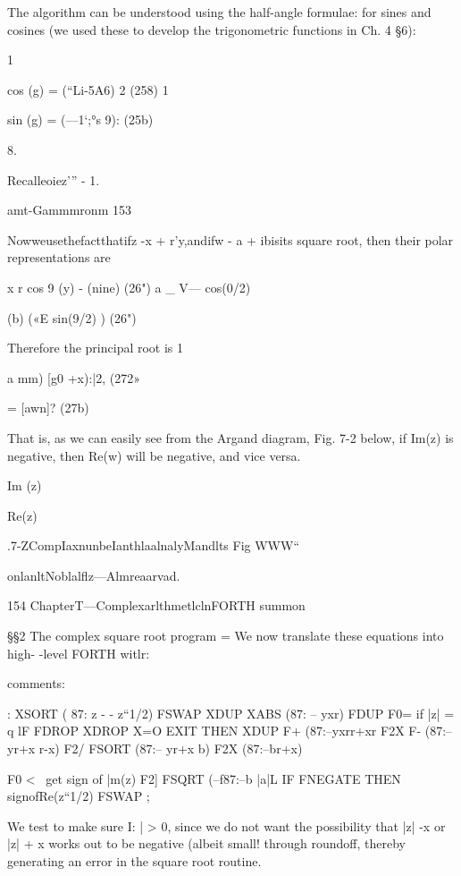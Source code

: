 {The algorithm can be understood using the half-angle formulae:
for sines and cosines (we used these to develop the trigonometric
functions in Ch. 4 §6):

1

cos (g) = (“Li-5A6) 2 (258)
1

sin (g) = (—1‘;°s 9): (25b)

 

8.

Recalleoiez'” - 1.

amt-Gammmronm 153

Nowweusethefactthatifz -x + r'y,andifw - a + ibisits
square root, then their polar representations are

x r cos 9
(y) - (nine) (26")
a _ V— cos(0/2)

(b) («E sin(9/2) ) (26")

Therefore the principal root is
1

a mm) [g0 +x):|2, (272»

= [awn]? (27b)

That is, as we can easily see from the Argand diagram, Fig. 7-2
below, if Im(z) is negative, then Re(w) will be negative, and vice
versa.

 

 

Im (z)

Re(z)

 

 

 

 

.7-ZCompIaxnunbeIanthlaalnalyMandlts
Fig WWW“

onlanltNoblalﬂz—Almreaarvad.

154 ChapterT—ComplexarlthmetlclnFORTH summon}

§§2 The complex square root program =
We now translate these equations into high- -level FORTH witlr:

comments:

: XSORT ( 87: z - - z“1/2)
FSWAP XDUP XABS (87: -- yxr)
FDUP F0= \retumO if |z| = q
lF FDROP XDROP X=O EXIT THEN
XDUP F+ (87:--yxrr+xr
F2X F- (87:-- yr+x r-x)
F2/ FSORT (87:-- yr+x b)
F2X (87:--br+x)

F0 < \ get sign of |m(z)
F2] FSQRT (--f87:--b |a|L
IF FNEGATE THEN  signofRe(z“1/2)
FSWAP ;

We test to make sure I: | > 0, since we do not want the possibility
that |z| -x or |z| + x works out to be negative (albeit small!
through roundoff, thereby generating an error in the square root
routine.

